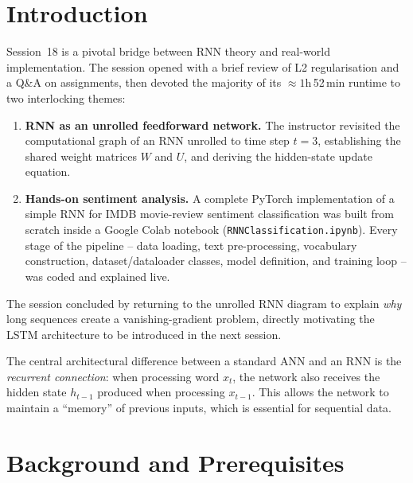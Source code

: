 \documentclass[12pt,a4paper]{article}
\begin{document}
\newpage

\section{Introduction}
\label{sec:introduction}

Session~18 is a pivotal bridge between RNN theory and real-world
implementation.  The session opened with a brief review of L2
regularisation and a Q\&A on assignments, then devoted the majority of
its $\approx 1$h\,52\,min runtime to two interlocking themes:

\begin{enumerate}[label=\textbf{\arabic*.}]
  \item \textbf{RNN as an unrolled feedforward network.}  The instructor
        revisited the computational graph of an RNN unrolled to time step
        $t=3$, establishing the shared weight matrices $W$ and $U$, and
        deriving the hidden-state update equation.
  \item \textbf{Hands-on sentiment analysis.}  A complete PyTorch
        implementation of a simple RNN for IMDB movie-review sentiment
        classification was built from scratch inside a Google Colab
        notebook (\texttt{RNNClassification.ipynb}).  Every stage of the
        pipeline -- data loading, text pre-processing, vocabulary
        construction, dataset/dataloader classes, model definition, and
        training loop -- was coded and explained live.
\end{enumerate}

The session concluded by returning to the unrolled RNN diagram to
explain \emph{why} long sequences create a vanishing-gradient problem,
directly motivating the LSTM architecture to be introduced in the
next session.

\begin{keyinsight}
The central architectural difference between a standard ANN and an RNN
is the \emph{recurrent connection}: when processing word $x_t$, the
network also receives the hidden state $h_{t-1}$ produced when
processing $x_{t-1}$.  This allows the network to maintain a
``memory'' of previous inputs, which is essential for sequential data.
\end{keyinsight}

\section{Background and Prerequisites}
\label{sec:background}
\end{document}
